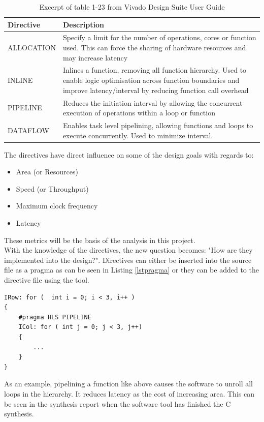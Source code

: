 \begin{table}[H]
\centering
    \begin{tabular}{|l|p{10cm}|}
    \hline
    Directive  & Description                                                                                                                                                                       \\ \hline
    ALLOCATION & Specify a limit for the number of operations, cores or function used. This can force the sharing of hardware resources and may increase latency                                   \\ \hline
    INLINE     & Inlines a function, removing all function hierarchy. Used to enable logic optimisation across function boundaries and improve latency/interval by reducing function call overhead \\ \hline
    PIPELINE   & Reduces the initiation interval by allowing the concurrent execution of operations within a loop or function                                                                      \\ \hline
    DATAFLOW   & Enables task level pipelining, allowing functions and loops to execute concurrently. Used to minimize interval.                                                                                                                                                                                 \\ \hline
    \end{tabular}
    \caption{Excerpt of table 1-23 from Vivado Design Suite User Guide}
    \label{tab:directives}
\end{table}
The directives have direct influence on some of the design goals with regards to:
\begin{itemize}
\item Area (or Resources)
\item Speed (or Throughput)
\item Maximum clock frequency
\item Latency
\end{itemize}
These metrics will be the basis of the analysis in this project.\\

With the knowledge of the directives, the new question becomes: "How are they implemented into the design?". Directives can either be inserted into the source file as a pragma as can be seen in Listing \ref{lstpragma} or they can be added to the directive file using the tool.
\begin{lstlisting}[caption={Inserting directive into source code.},label=lstpragma]
IRow: for (  int i = 0; i < 3, i++ )
{
	#pragma HLS PIPELINE
	ICol: for ( int j = 0; j < 3, j++)
	{
		...
	}
}
\end{lstlisting}
As an example, pipelining a function like above causes the software to unroll all loops in the hierarchy. It reduces latency as the cost of increasing area. This can be seen in the synthesis report when the software tool has finished the C synthesis.

